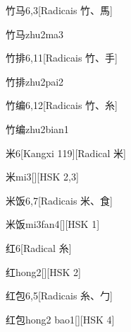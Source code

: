 \begin{entry}{竹马}{6,3}[Radicais ⽵、⾺]
  \begin{phonetics}{竹马}{zhu2ma3}
  \end{phonetics}
\end{entry}

\begin{entry}{竹排}{6,11}[Radicais ⽵、⼿]
  \begin{phonetics}{竹排}{zhu2pai2}
  \end{phonetics}
\end{entry}

\begin{entry}{竹编}{6,12}[Radicais ⽵、⽷]
  \begin{phonetics}{竹编}{zhu2bian1}
  \end{phonetics}
\end{entry}

\begin{entry}{米}{6}[Kangxi 119][Radical ⽶]
  \begin{phonetics}{米}{mi3}[][HSK 2,3]
  \end{phonetics}
\end{entry}

\begin{entry}{米饭}{6,7}[Radicais ⽶、⾷]
  \begin{phonetics}{米饭}{mi3fan4}[][HSK 1]
  \end{phonetics}
\end{entry}

\begin{entry}{红}{6}[Radical ⽷]
  \begin{phonetics}{红}{hong2}[][HSK 2]
  \end{phonetics}
\end{entry}

\begin{entry}{红包}{6,5}[Radicais ⽷、⼓]
  \begin{phonetics}{红包}{hong2 bao1}[][HSK 4]
  \end{phonetics}
\end{entry}

